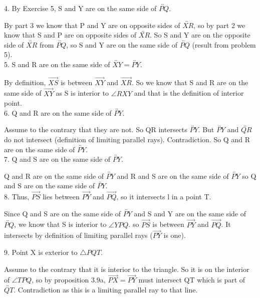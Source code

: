 \documentclass[12pt,letterpaper]{article}
\begin{document}
4. By Exercise 5, S and Y are on the same side of $\overleftrightarrow{PQ}$.  

By part 3 we know that P and Y are on opposite sides of $\overleftrightarrow{XR}$, so by part 2 we know that S and P are on opposite sides of $\overleftrightarrow{XR}$. So S and Y are on the opposite side of $\overleftrightarrow{XR}$ from $\overleftrightarrow{PQ}$, so S and Y are on the same side of $\overleftrightarrow{PQ}$ (result from problem 5).\\


5. S and R are on the same side of $\overleftrightarrow{XY} = \overleftrightarrow{PY}.$

By definition, $\overrightarrow{XS}$ is between $\overrightarrow{XY}$ and $\overrightarrow{XR}$.  So we know that S and R  are on the same side of $\overrightarrow{XY}$ as S is interior to $\angle RXY$ and that is the definition of interior point.\\


6. Q and R are on the same side of $\overleftrightarrow{PY}$.

Assume to the contrary that they are not.  So QR intersects $\overleftrightarrow{PY}$. But $\overleftrightarrow{PY}$ and $\overleftrightarrow{QR}$ do not intersect (definition of limiting parallel rays).  Contradiction.  So Q and R are on the same side of $\overleftrightarrow{PY}$. \\


7. Q and S are on the same side of $\overleftrightarrow{PY}$.

Q and R are on the same side of $\overleftrightarrow{PY}$ and R and S are on the same side of $\overleftrightarrow{PY}$ so Q and S are on the same side of $\overleftrightarrow{PY}$. \\


8. Thus, $\overrightarrow{PS}$ lies between $\overrightarrow{PY} $ and $\overrightarrow{PQ}$, so it intersects l in a point T.  

Since Q and S are on the same side of $\overleftrightarrow{PY}$ and S and Y are on the same side of $\overleftrightarrow{PQ}$, we know that S is interior to $\angle YPQ$. so $\overrightarrow{PS}$ is between $\overrightarrow{PY} $ and $\overrightarrow{PQ}$.  It intersects by definition of limiting parallel rays ($\overrightarrow{PY}$ is one).\



9. Point X is exterior to $\triangle PQT$.  

Assume to the contrary that it is interior to the triangle.  So it is on the interior of $\angle TPQ$, so by proposition 3.9a, $\overrightarrow{PX} = \overrightarrow{PY}$ must intersect QT which is part of $\overleftrightarrow{QT}$.  Contradiction as this is a limiting parallel ray to that line. \\
\end{document}
